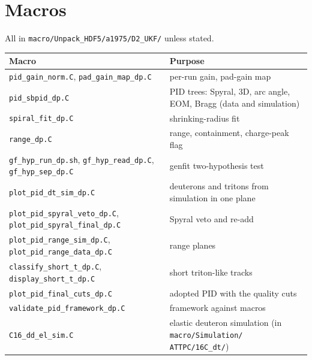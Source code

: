 \documentclass[11pt,a4paper]{article}
\newcommand{\code}[1]{\texttt{#1}}
\begin{document}
\appendix
\section{Macros}

All in \code{macro/Unpack\_HDF5/a1975/D2\_UKF/} unless stated.

\begin{center}
\small
\begin{tabular}{p{}p{}}
  \toprule
  Macro & Purpose \\
  \midrule
  \code{pid\_gain\_norm.C}, \code{pad\_gain\_map\_dp.C} & per-run gain, pad-gain map \\
  \code{pid\_sbpid\_dp.C} & PID trees: Spyral, 3D, arc angle, EOM, Bragg (data and simulation) \\
  \code{spiral\_fit\_dp.C} & shrinking-radius fit \\
  \code{range\_dp.C} & range, containment, charge-peak flag \\
  \code{gf\_hyp\_run\_dp.sh}, \code{gf\_hyp\_read\_dp.C}, \code{gf\_hyp\_sep\_dp.C} & genfit two-hypothesis test \\
  \code{plot\_pid\_dt\_sim\_dp.C} & deuterons and tritons from simulation in one plane \\
  \code{plot\_pid\_spyral\_veto\_dp.C}, \code{plot\_pid\_spyral\_final\_dp.C} & Spyral veto and re-add \\
  \code{plot\_pid\_range\_sim\_dp.C}, \code{plot\_pid\_range\_data\_dp.C} & range planes \\
  \code{classify\_short\_t\_dp.C}, \code{display\_short\_t\_dp.C} & short triton-like tracks \\
  \code{plot\_pid\_final\_cuts\_dp.C} & adopted PID with the quality cuts \\
  \code{validate\_pid\_framework\_dp.C} & framework against macros \\
  \code{C16\_dd\_el\_sim.C} & elastic deuteron simulation (in \code{macro/Simulation/} \code{ATTPC/16C\_dt/}) \\
  \bottomrule
\end{tabular}
\end{center}
\end{document}
